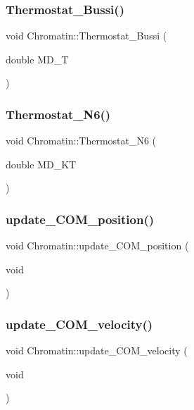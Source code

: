 \subsubsection{\texorpdfstring{Thermostat\_Bussi()}{Thermostat\_Bussi()}}
{\footnotesize\ttfamily void Chromatin\+::\+Thermostat\+\_\+\+Bussi (\begin{DoxyParamCaption}\item[{double}]{M\+D\+\_\+T }\end{DoxyParamCaption})}

\mbox{\label{classChromatin_a1bdebb39143cec34dcf0d4f9b5252a71}} 
\subsubsection{\texorpdfstring{Thermostat\_N6()}{Thermostat\_N6()}}
{\footnotesize\ttfamily void Chromatin\+::\+Thermostat\+\_\+\+N6 (\begin{DoxyParamCaption}\item[{double}]{M\+D\+\_\+\+KT }\end{DoxyParamCaption})}

\mbox{\label{classChromatin_a95a89f98d688ff8ca440fbef34086199}} 
\subsubsection{\texorpdfstring{update\_COM\_position()}{update\_COM\_position()}}
{\footnotesize\ttfamily void Chromatin\+::update\+\_\+\+C\+O\+M\+\_\+position (\begin{DoxyParamCaption}\item[{void}]{ }\end{DoxyParamCaption})\hspace{0.3cm}{\ttfamily [inline]}}

\mbox{\label{classChromatin_ab732de686eb3f5db5ce402b58a5d8ea6}} 
\subsubsection{\texorpdfstring{update\_COM\_velocity()}{update\_COM\_velocity()}}
{\footnotesize\ttfamily void Chromatin\+::update\+\_\+\+C\+O\+M\+\_\+velocity (\begin{DoxyParamCaption}\item[{void}]{ }\end{DoxyParamCaption})\hspace{0.3cm}{\ttfamily [inline]}}

